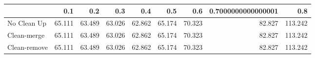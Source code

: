 \begin{tabular}{lrrrrrrrr}
\toprule
{} &    0.1 &    0.2 &    0.3 &    0.4 &    0.5 &    0.6 & 0.7000000000000001 &     0.8 \\
\midrule
No Clean Up  & 65.111 & 63.489 & 63.026 & 62.862 & 65.174 & 70.323 &             82.827 & 113.242 \\
Clean-merge  & 65.111 & 63.489 & 63.026 & 62.862 & 65.174 & 70.323 &             82.827 & 113.242 \\
Clean-remove & 65.111 & 63.489 & 63.026 & 62.862 & 65.174 & 70.323 &             82.827 & 113.242 \\
\bottomrule
\end{tabular}
